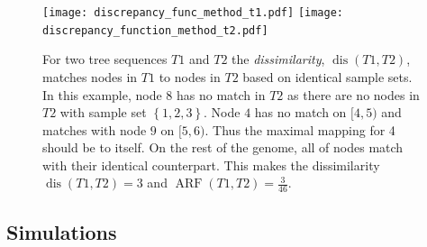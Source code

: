 \documentclass[10pt,twoside,lineno]{gsajnl}
\newcommand{\dis}{\operatorname{dis}}
\begin{document}
\begin{figure}[!ht]
	\begin{center}
\texttt{[image: discrepancy\_func\_method\_t1.pdf]}
\texttt{[image: discrepancy\_function\_method\_t2.pdf]}
    \caption{
        For two tree sequences $T1$ and $T2$ the \emph{dissimilarity}, $\dis(T1,T2)$, matches nodes in $T1$ to nodes in $T2$
        based on identical sample sets.
        In this example, node $8$ has no match in $T2$ as there are no nodes in $T2$ with sample set $\left\{1,2,3\right\}$.
        Node $4$ has no match on $[4,5)$ and matches with node $9$ on $[5,6)$. Thus the maximal mapping for 4 should be to itself. On the rest of the genome, all of nodes match with their identical counterpart.
        This makes the dissimilarity $\dis(T1,T2)=3$ and $\operatorname{ARF}(T1,T2)=\frac{3}{46}$.
        \label{fig:conceptual_discrepancy}
    }
	\end{center}
\end{figure}

\subsection{Simulations}
\end{document}
